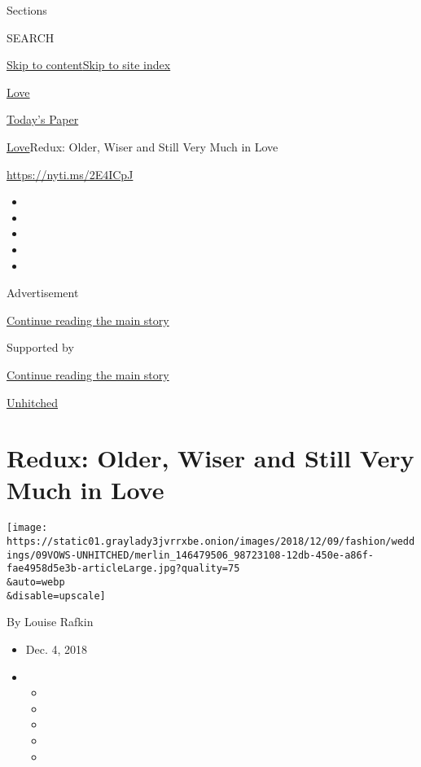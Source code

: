 Sections

SEARCH

\protect\hyperlink{site-content}{Skip to
content}\protect\hyperlink{site-index}{Skip to site index}

\href{https://www.nytimes3xbfgragh.onion/section/fashion/weddings}{Love}

\href{https://myaccount.nytimes3xbfgragh.onion/auth/login?response_type=cookie\&client_id=vi}{}

\href{https://www.nytimes3xbfgragh.onion/section/todayspaper}{Today's
Paper}

\href{/section/fashion/weddings}{Love}\textbar{}Redux: Older, Wiser and
Still Very Much in Love

\url{https://nyti.ms/2E4ICpJ}

\begin{itemize}
\item
\item
\item
\item
\item
\end{itemize}

Advertisement

\protect\hyperlink{after-top}{Continue reading the main story}

Supported by

\protect\hyperlink{after-sponsor}{Continue reading the main story}

\href{/column/unhitched}{Unhitched}

\hypertarget{redux-older-wiser-and-still-very-much-in-love}{%
\section{Redux: Older, Wiser and Still Very Much in
Love}\label{redux-older-wiser-and-still-very-much-in-love}}

\texttt{[image: https://static01.graylady3jvrrxbe.onion/images/2018/12/09/fashion/weddings/09VOWS-UNHITCHED/merlin\_146479506\_98723108-12db-450e-a86f-fae4958d5e3b-articleLarge.jpg?quality=75\\\&auto=webp\\\&disable=upscale]}

By Louise Rafkin

\begin{itemize}
\item
  Dec. 4, 2018
\item
  \begin{itemize}
  \item
  \item
  \item
  \item
  \item
  \end{itemize}
\end{itemize}

